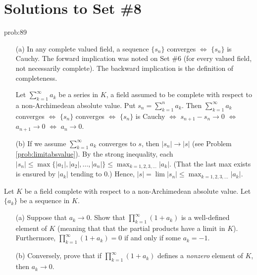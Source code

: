 \chapter*{Solutions to Set \#8}
\label{set7sols}

\begin{sol}{prob:89} 
\begin{enumerate}
    \item[(a)] In any complete valued field, a sequence $\{s_n\}$ converges  $\Longleftrightarrow$ $\{s_n\}$ is Cauchy. The forward implication was noted on Set \#6 (for every valued field, not necessarily complete). The backward implication is the definition of completeness.

Let $\sum_{k=1}^{\infty}a_k$ be a series in $K$, a field assumed to be complete with respect to a non-Archimedean absolute value. Put $s_n = \sum_{k=1}^{n} a_k$. Then $\sum_{k=1}^{\infty} a_k$ converges $\Longleftrightarrow$ $\{s_n\}$ converges $\Longleftrightarrow$ $\{s_n\}$ is Cauchy $\Longleftrightarrow$ $s_{n+1}-s_n \to 0$ $\Longleftrightarrow$ $a_{n+1}  \to 0$ $\Longleftrightarrow$ $a_n \to 0$.

\item[(b)] If we assume $\sum_{k=1}^{\infty}a_k$ converges to $s$, then $|s_n| \to |s|$ (see Problem \ref{prob:limitabsvalue}). By the strong inequality, each $|s_n| \le \max\{|a_1|, |a_2|, \dots, |a_n|\} \le \max_{k=1,2,3,\dots}|a_k|$. (That the last max exists is ensured by $|a_k|$ tending to $0$.) Hence, $|s| = \lim |s_n| \le \max_{k=1,2,3,\dots}|a_k|$.
\end{enumerate}
\end{sol}

\begin{challenge}\label{pp:infprod} Let $K$ be a field complete with respect to a non-Archimedean absolute value. Let $\{a_k\}$ be a sequence in $K$.
\begin{enumerate}
\vspace{-0.12in}
    \item[(a)] Suppose that $a_k\to 0$. Show that $\prod_{k=1}^{\infty} (1+a_k)$ is a well-defined element of $K$ (meaning that that the partial products have a limit in $K$). Furthermore, $\prod_{k=1}^{\infty} (1+a_k) = 0$ if and only if some $a_k=-1$.
    \item[(b)] Conversely, prove that if $\prod_{k=1}^{\infty}(1+a_k)$ defines a \emph{nonzero} element of $K$, then $a_k\to 0$.
\end{enumerate} 
\end{challenge}

